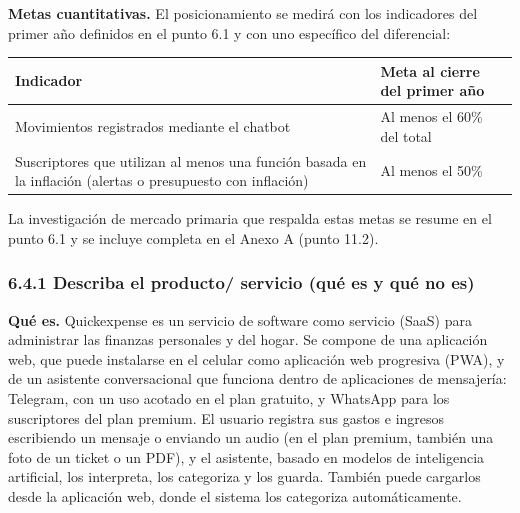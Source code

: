 \textbf{Metas cuantitativas.} El posicionamiento se medirá con los
indicadores del primer año definidos en el punto 6.1 y con uno
específico del diferencial:

{\def\LTcaptype{none} %
\begin{longtable}[]{@{}
  >{\raggedright\arraybackslash}p{}
  >{\raggedright\arraybackslash}p{}@{}}
\toprule\noalign{}
\begin{minipage}[b]{\linewidth}\raggedright
Indicador
\end{minipage} & \begin{minipage}[b]{\linewidth}\raggedright
Meta al cierre del primer año
\end{minipage} \\
\midrule\noalign{}
\endhead
\bottomrule\noalign{}
\endlastfoot
Movimientos registrados mediante el chatbot & Al menos el 60\% del
total \\
Suscriptores que utilizan al menos una función basada en la inflación
(alertas o presupuesto con inflación) & Al menos el 50\% \\
\end{longtable}
}

La investigación de mercado primaria que respalda estas metas se resume
en el punto 6.1 y se incluye completa en el Anexo A (punto 11.2).


\subsubsection*{6.4.1 Describa el producto/ servicio (qué es y qué no
es)}\label{describa-el-producto-servicio-quuxe9-es-y-quuxe9-no-es}

\textbf{Qué es.} Quickexpense es un servicio de software como servicio
(SaaS) para administrar las finanzas personales y del hogar. Se compone
de una aplicación web, que puede instalarse en el celular como
aplicación web progresiva (PWA), y de un asistente conversacional que
funciona dentro de aplicaciones de mensajería: Telegram, con un uso
acotado en el plan gratuito, y WhatsApp para los suscriptores del plan
premium. El usuario registra sus gastos e ingresos escribiendo un
mensaje o enviando un audio (en el plan premium, también una foto de un
ticket o un PDF), y el asistente, basado en modelos de inteligencia
artificial, los interpreta, los categoriza y los guarda. También puede
cargarlos desde la aplicación web, donde el sistema los categoriza
automáticamente.

